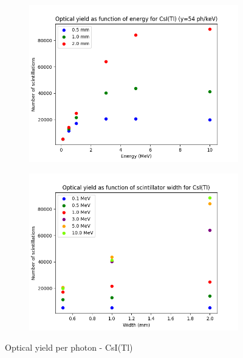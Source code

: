 \documentclass{article}
\begin{document}
\begin{figure}[H]
\centering
\begin{subfigure}{.5\textwidth}
  \centering
  \includegraphics[width=\linewidth]{images/task3/scintills_energy_CsI.png}
  \caption{}
\end{subfigure}%
\begin{subfigure}{.5\textwidth}
  \centering
  \includegraphics[width=\linewidth]{images/task3/scintills_width_CsI_part.png}
  \caption{}
\end{subfigure}
\caption{Optical yield per photon - CsI(Tl)}
\end{figure}
\end{document}
